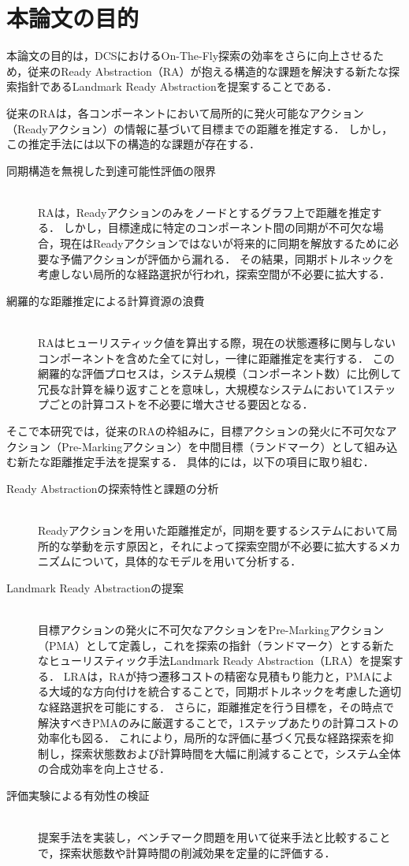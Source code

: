 \documentclass[a4paper,11pt,oneside,openany,report,dvipdfmx]{jsbook}
\newcommand{\descitem}[1]{\item[#1]\mbox{}\\}
\begin{document}
\section{本論文の目的}

本論文の目的は，DCSにおけるOn-The-Fly探索の効率をさらに向上させるため，従来のReady Abstraction（RA）が抱える構造的な課題を解決する新たな探索指針であるLandmark Ready Abstractionを提案することである．

従来のRAは，各コンポーネントにおいて局所的に発火可能なアクション（Readyアクション）の情報に基づいて目標までの距離を推定する．
しかし，この推定手法には以下の構造的な課題が存在する．

\begin{description}
  \descitem{同期構造を無視した到達可能性評価の限界}
  RAは，Readyアクションのみをノードとするグラフ上で距離を推定する．
  しかし，目標達成に特定のコンポーネント間の同期が不可欠な場合，現在はReadyアクションではないが将来的に同期を解放するために必要な予備アクションが評価から漏れる．
  その結果，同期ボトルネックを考慮しない局所的な経路選択が行われ，探索空間が不必要に拡大する．
  \descitem{網羅的な距離推定による計算資源の浪費}
  RAはヒューリスティック値を算出する際，現在の状態遷移に関与しないコンポーネントを含めた全てに対し，一律に距離推定を実行する．
  この網羅的な評価プロセスは，システム規模（コンポーネント数）に比例して冗長な計算を繰り返すことを意味し，大規模なシステムにおいて1ステップごとの計算コストを不必要に増大させる要因となる．
\end{description}

そこで本研究では，従来のRAの枠組みに，目標アクションの発火に不可欠なアクション（Pre-Markingアクション）を中間目標（ランドマーク）として組み込む新たな距離推定手法を提案する．
具体的には，以下の項目に取り組む．

\begin{description}
  \descitem{Ready Abstractionの探索特性と課題の分析}
  Readyアクションを用いた距離推定が，同期を要するシステムにおいて局所的な挙動を示す原因と，それによって探索空間が不必要に拡大するメカニズムについて，具体的なモデルを用いて分析する．
  \descitem{Landmark Ready Abstractionの提案}
  目標アクションの発火に不可欠なアクションをPre-Markingアクション（PMA）として定義し，これを探索の指針（ランドマーク）とする新たなヒューリスティック手法Landmark Ready Abstraction（LRA）を提案する．
  LRAは，RAが持つ遷移コストの精密な見積もり能力と，PMAによる大域的な方向付けを統合することで，同期ボトルネックを考慮した適切な経路選択を可能にする．
  さらに，距離推定を行う目標を，その時点で解決すべきPMAのみに厳選することで，1ステップあたりの計算コストの効率化も図る．
  これにより，局所的な評価に基づく冗長な経路探索を抑制し，探索状態数および計算時間を大幅に削減することで，システム全体の合成効率を向上させる．
  \descitem{評価実験による有効性の検証}
  提案手法を実装し，ベンチマーク問題を用いて従来手法と比較することで，探索状態数や計算時間の削減効果を定量的に評価する．
\end{description}
\end{document}
